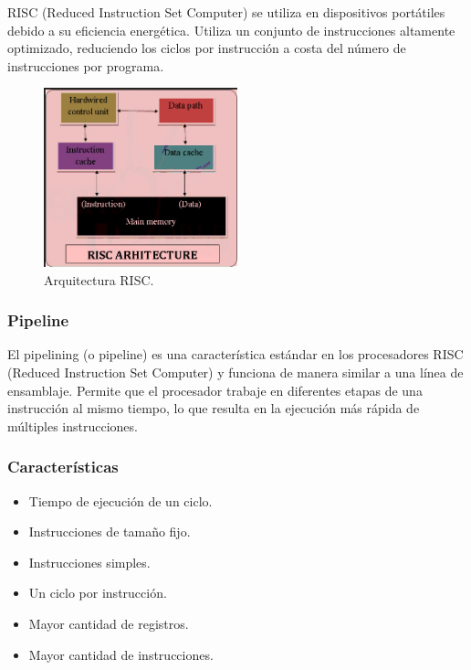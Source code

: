 \documentclass[12pt]{report}
\begin{document}
RISC (Reduced Instruction Set Computer) se utiliza en dispositivos portátiles debido a su eficiencia energética.
Utiliza un conjunto de instrucciones altamente optimizado, reduciendo los ciclos por instrucción a costa del número de instrucciones por programa.
\begin{figure}[H]
  \centering
  \includegraphics[width=0.5\textwidth]{RISC.png}
  \caption{Arquitectura RISC.}
  \label{fig:risc}
\end{figure}
\subsubsection{Pipeline}
El pipelining (o pipeline) es una característica estándar en los procesadores RISC (Reduced Instruction Set Computer) y funciona de manera similar a una línea de ensamblaje. Permite que el procesador trabaje en diferentes etapas de una instrucción al mismo tiempo, lo que resulta en la ejecución más rápida de múltiples instrucciones.\cite{3}
\subsubsection{Características}
\begin{itemize}
  \item Tiempo de ejecución de un ciclo.
  \item Instrucciones de tamaño fijo.
  \item Instrucciones simples.
  \item Un ciclo por instrucción.
  \item Mayor cantidad de registros.
  \item Mayor cantidad de instrucciones.
\end{itemize}
\end{document}
